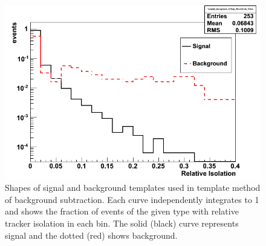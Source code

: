  \begin{figure}[htb]
  \begin{center}
    \includegraphics[width=360pt]{Figures/TemplateShapes-01Mar11-lines.png}
  \end{center}
  \caption[\fixspacing Shapes of signal and background templates used in 
    template method of background subtraction]{
    \fixspacing Shapes of signal and background templates 
    used in template method of background subtraction.
    Each curve independently integrates to 1 
    and shows the fraction of events of the given type 
    with relative tracker isolation in each bin.  
    The solid (black) curve represents signal 
    and the dotted (red) shows background.  
  }
  \label{fig:TemplateShapes}
 \end{figure}

